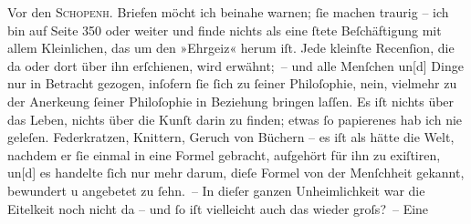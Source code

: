 \pstart
           {\pb}Vor den \textsc{Schopenh}. Briefen möcht ich beinahe warnen; ſie
               machen traurig – ich bin auf Seite 350 oder weiter und finde nichts als eine ſtete
               Beſchäftigung mit allem Kleinlichen, das um den »Ehrgeiz« herum iſt. Jede kleinſte
               Recenſion, die da oder dort über ihn erſchienen, wird erwähnt; – und alle Menſchen
                  un{[}d{]} Dinge nur in Betracht gezogen, inſofern ſie ſich zu
               ſeiner Philoſophie, nein, vielmehr zu der Anerke{\geminationn}ung
               ſeiner Philoſophie in Beziehung bringen laſſen. Es iſt nichts über das Leben, nichts
               über die Kunſt darin zu {\pb}finden; etwas ſo papierenes hab
               ich nie geleſen. Federkratzen, Knittern, Geruch von Büchern – es iſt als hätte die
               Welt, nachdem er ſie einmal in eine Formel gebracht, aufgehört für ihn zu exiſtiren,
                  un{[}d{]} es handelte ſich nur mehr darum, dieſe Formel von der
               Menſchheit gekannt, bewundert u angebetet zu ſehn. – In dieſer ganzen Unheimlichkeit
               war die Eitelkeit noch nicht da – und ſo iſt vielleicht auch das wieder groſs? – Eine
